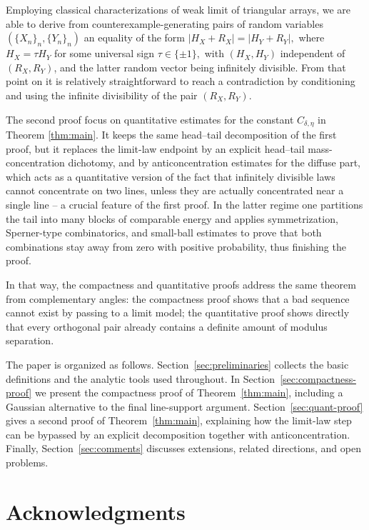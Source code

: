 \documentclass[11pt]{amsart}
\numberwithin{equation}{section}
\theoremstyle{definition}
\theoremstyle{remark}
\begin{document}
Employing classical characterizations of weak limit of triangular arrays, we are able to derive from counterexample-generating pairs of random variables $(\{X_n\}_n, \{Y_n\}_n)$ an equality of the form $|H_X + R_X| = |H_Y + R_Y|,$ where $H_X = \tau H_Y$ for some universal sign $\tau \in \{\pm1\},$ with $(H_X,H_Y)$ independent of $(R_X,R_Y)$, and the latter random vector being infinitely divisible. From that point on it is relatively straightforward to reach a contradiction by conditioning and using the infinite divisibility of the pair $(R_X,R_Y).$

The second proof focus on quantitative estimates for the constant $C_{\delta,\eta}$ in Theorem \ref{thm:main}. It keeps the same head--tail decomposition of the first proof, but it replaces the limit-law endpoint by an
explicit head--tail mass-concentration dichotomy, and by anticoncentration estimates for the
diffuse part, which acts as a quantitative version of the fact that infinitely divisible laws cannot concentrate on two lines, unless they are actually concentrated near a single line -- a crucial feature of the first proof. In the latter regime one partitions the tail into many blocks of
comparable energy and applies symmetrization, Sperner-type combinatorics, and
small-ball estimates to prove that both combinations stay away from zero with
positive probability, thus finishing the proof. 

In that way, the compactness and quantitative proofs address
the same theorem from complementary angles: the compactness proof shows that a
bad sequence cannot exist by passing to a limit model; the quantitative proof
shows directly that every orthogonal pair already contains a definite amount of
modulus separation.



The paper is organized as follows.  Section~\ref{sec:preliminaries} collects
the basic definitions and the analytic tools used throughout.  In
Section~\ref{sec:compactness-proof} we present the compactness proof of
Theorem~\ref{thm:main}, including a Gaussian alternative to the final
line-support argument.  Section~\ref{sec:quant-proof} gives a second proof of
Theorem~\ref{thm:main}, explaining how the limit-law step can be bypassed by an
explicit decomposition together with anticoncentration.
Finally, Section~\ref{sec:comments} discusses extensions, related directions,
and open problems.  

\section*{Acknowledgments} 
\end{document}
